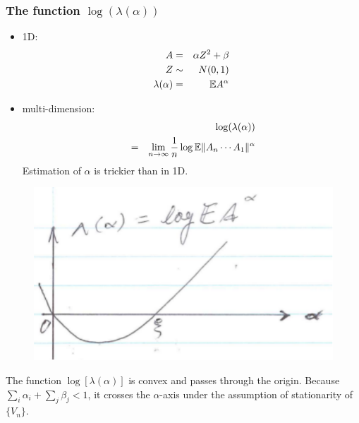 \documentclass{beamer}
\begin{document}
\begin{frame}
  \frametitle{The function $\log(\lambda(\alpha))$}
  \begin{minipage}{0.5\linewidth}
    \begin{small}
      \begin{itemize}
      \item 1D:
        \begin{eqnarray*}
          A &=& \alpha Z^2 + \beta \\
          Z &\sim& N(0,1) \\
          \lambda(\alpha) &=& \mathbb{E} A^\alpha          
        \end{eqnarray*}
      \item multi-dimension:
        \begin{eqnarray*}
          && \log(\lambda(\alpha)) \\
          &=&
          \lim_{n \to \infty} {1 \over n} \log \mathbb{E} \|A_n \cdots A_1\|^\alpha
        \end{eqnarray*}
        Estimation of $\alpha$ is trickier than in 1D.
      \end{itemize}
    \end{small}
  \end{minipage}\hfill
  \begin{minipage}{0.4\linewidth}
    \begin{figure}
      \centering
      \includegraphics[width=1.0\linewidth]{pic2.pdf}
    \end{figure}
    \begin{scriptsize}
      The function $\log[\lambda(\alpha)]$ is convex and passes through the origin.
      Because $\sum_i \alpha_i + \sum_j \beta_j < 1$, it crosses the $\alpha$-axis
      under the assumption of stationarity of $\{V_n\}$.
    \end{scriptsize}
  \end{minipage}
\end{frame}
\end{document}
